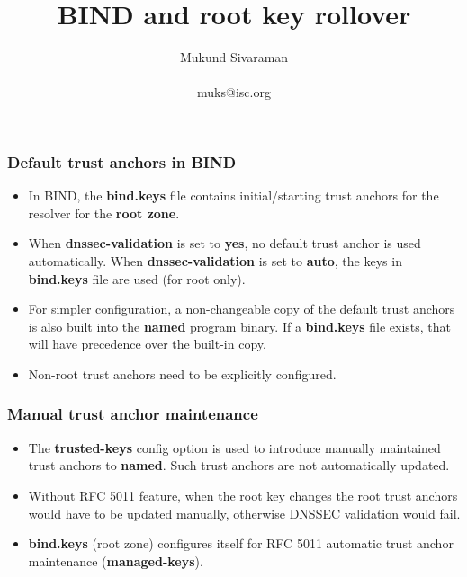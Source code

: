 \documentclass{beamer}
\title{BIND and root key rollover}
\author{Mukund Sivaraman\\
~\\
\small muks@isc.org}
\institute{Internet Systems Consortium}
\date{}
\begin{document}
\frame{\titlepage}

\frame
{
  \frametitle{Default trust anchors in BIND}

  \begin{itemize}

  \item In BIND, the \textbf{bind.keys} file contains initial/starting
    trust anchors for the resolver for the \textbf{root zone}.

  \item When \textbf{dnssec-validation} is set to \textbf{yes}, no
    default trust anchor is used automatically. When
    \textbf{dnssec-validation} is set to \textbf{auto}, the keys in
    \textbf{bind.keys} file are used (for root only).

  \item For simpler configuration, a non-changeable copy of the default
    trust anchors is also built into the \textbf{named} program
    binary. If a \textbf{bind.keys} file exists, that will have
    precedence over the built-in copy.

  \item Non-root trust anchors need to be explicitly configured.

  \end{itemize}
}

\frame
{
  \frametitle{Manual trust anchor maintenance}

  \begin{itemize}
  \item The \textbf{trusted-keys} config option is used to introduce
    manually maintained trust anchors to \textbf{named}. Such trust
    anchors are not automatically updated.

  \item Without RFC 5011 feature, when the root key changes the root
    trust anchors would have to be updated manually, otherwise DNSSEC
    validation would fail.

  \item \textbf{bind.keys} (root zone) configures itself for RFC 5011
    automatic trust anchor maintenance (\textbf{managed-keys}).

  \end{itemize}
}
\end{document}
